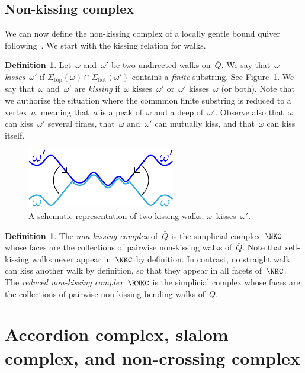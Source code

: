 \documentclass{amsart}
\theoremstyle{definition}
\newtheorem{definition}[theorem]{Definition}
\newcommand{\fref}[1]{Figure~\ref{#1}} %
\newcommand{\darkblue}{\color{darkblue}} %
\newcommand{\defn}[1]{\textsl{\darkblue #1}} %
\renewcommand{\top}{\mathrm{top}} %
\newcommand{\bottom}{\mathrm{bot}} %
\begin{document}
\subsection{Non-kissing complex}

We can now define the non-kissing complex of a locally gentle bound quiver following~\cite{McConville, PaluPilaudPlamondon, BrustleDouvilleMousavandThomasYildirim}.
We start with the kissing relation for walks.

\begin{definition}
\label{def:kiss}
Let~$\omega$ and~$\omega'$ be two undirected walks on~$\bar Q$.
We say that~$\omega$ \defn{kisses}~$\omega'$ if ${\Sigma_\top(\omega) \cap \Sigma_\bottom(\omega')}$ contains a \emph{finite} substring.
See \fref{fig:kissing}.
We say that~$\omega$ and~$\omega'$ are \defn{kissing} if~$\omega$ kisses~$\omega'$ or~$\omega'$ kisses~$\omega$ (or both).
Note that we authorize the situation where the commmon finite substring is reduced to a vertex~$a$, meaning that~$a$ is a peak of~$\omega$ and a deep of~$\omega'$.
Observe also that~$\omega$ can kiss~$\omega'$ several times, that~$\omega$ and~$\omega'$ can mutually kiss, and that~$\omega$ can kiss itself.
%
\begin{figure}[h]
	\capstart
	\centerline{\includegraphics[scale=1]{kissing}}
	\caption{A schematic representation of two kissing walks: $\omega$~kisses~$\omega'$.}
	\label{fig:kissing}
\end{figure}
%
\end{definition}

\begin{definition}
\label{def:nKc}
The \defn{non-kissing complex} of~$\bar Q$ is the simplicial complex~$\NKC$ whose faces are the collections of pairwise non-kissing walks of~$\bar Q$.
Note that self-kissing walks never appear in~$\NKC$ by definition.
In contrast, no straight walk can kiss another walk by definition, so that they appear in all facets of~$\NKC$.
The \defn{reduced non-kissing complex}~$\RNKC$ is the simplicial complex whose faces are the collections of pairwise non-kissing bending walks of~$\bar Q$.
\end{definition}

\section{Accordion complex, slalom complex, and non-crossing complex}\label{sec:accordionSlalomNonCrossingComplexes}
\end{document}
